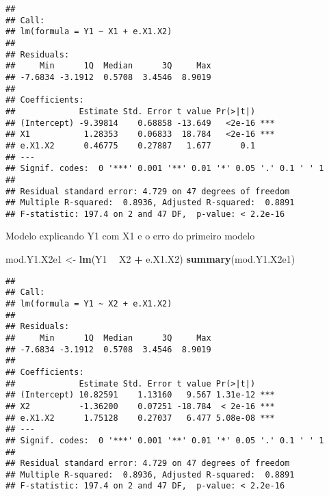 \documentclass[]{article}
\newenvironment{Shaded}{\begin{snugshade}}{\end{snugshade}}
\newcommand{\KeywordTok}[1]{\textcolor[rgb]{0.13,0.29,0.53}{\textbf{#1}}}
\newcommand{\StringTok}[1]{\textcolor[rgb]{0.31,0.60,0.02}{#1}}
\newcommand{\OperatorTok}[1]{\textcolor[rgb]{0.81,0.36,0.00}{\textbf{#1}}}
\newcommand{\NormalTok}[1]{#1}
\begin{document}
\begin{verbatim}
## 
## Call:
## lm(formula = Y1 ~ X1 + e.X1.X2)
## 
## Residuals:
##     Min      1Q  Median      3Q     Max 
## -7.6834 -3.1912  0.5708  3.4546  8.9019 
## 
## Coefficients:
##             Estimate Std. Error t value Pr(>|t|)    
## (Intercept) -9.39814    0.68858 -13.649   <2e-16 ***
## X1           1.28353    0.06833  18.784   <2e-16 ***
## e.X1.X2      0.46775    0.27887   1.677      0.1    
## ---
## Signif. codes:  0 '***' 0.001 '**' 0.01 '*' 0.05 '.' 0.1 ' ' 1
## 
## Residual standard error: 4.729 on 47 degrees of freedom
## Multiple R-squared:  0.8936, Adjusted R-squared:  0.8891 
## F-statistic: 197.4 on 2 and 47 DF,  p-value: < 2.2e-16
\end{verbatim}

Modelo explicando Y1 com X1 e o erro do primeiro modelo

\begin{Shaded}
\begin{Highlighting}[]
\NormalTok{mod.Y1.X2e1 <-}\StringTok{ }\KeywordTok{lm}\NormalTok{(Y1 }\OperatorTok{~}\StringTok{ }\NormalTok{X2 }\OperatorTok{+}\StringTok{ }\NormalTok{e.X1.X2)}
\KeywordTok{summary}\NormalTok{(mod.Y1.X2e1)}
\end{Highlighting}
\end{Shaded}

\begin{verbatim}
## 
## Call:
## lm(formula = Y1 ~ X2 + e.X1.X2)
## 
## Residuals:
##     Min      1Q  Median      3Q     Max 
## -7.6834 -3.1912  0.5708  3.4546  8.9019 
## 
## Coefficients:
##             Estimate Std. Error t value Pr(>|t|)    
## (Intercept) 10.82591    1.13160   9.567 1.31e-12 ***
## X2          -1.36200    0.07251 -18.784  < 2e-16 ***
## e.X1.X2      1.75128    0.27037   6.477 5.08e-08 ***
## ---
## Signif. codes:  0 '***' 0.001 '**' 0.01 '*' 0.05 '.' 0.1 ' ' 1
## 
## Residual standard error: 4.729 on 47 degrees of freedom
## Multiple R-squared:  0.8936, Adjusted R-squared:  0.8891 
## F-statistic: 197.4 on 2 and 47 DF,  p-value: < 2.2e-16
\end{verbatim}
\end{document}
